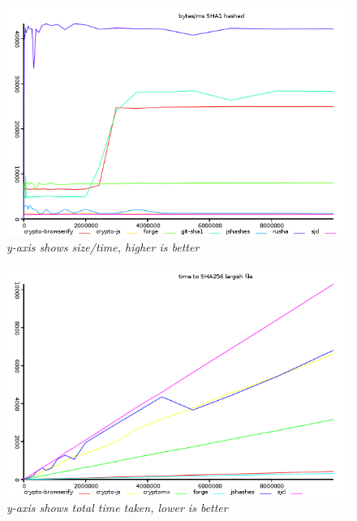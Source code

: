 \begin{figure}[htpb]
\centering
\caption{\small \sl y-axis shows size/time, higher is better
\label{fig:hash-ops-sha1}}
\includegraphics[scale=0.6]{graphs/hash-ops-sha1.png}
\end{figure}

\begin{figure}[htpb]
\centering
\caption{\small \sl y-axis shows total time taken, lower is better
\label{fig:hash-sha256}}
\includegraphics[scale=0.6]{graphs/hash-sha256.png}
\end{figure}

